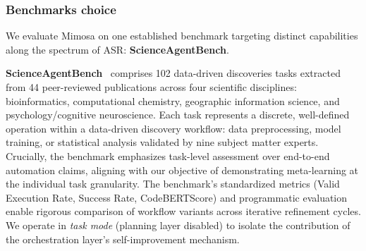 \documentclass{article}
\begin{document}
\subsubsection{Benchmarks choice}

We evaluate Mimosa on one established benchmark targeting distinct capabilities along the spectrum of ASR: \textbf{ScienceAgentBench}.

\textbf{ScienceAgentBench}~\cite{33_chen2025scienceagentbenchrigorousassessmentlanguage} comprises 102 data-driven discoveries tasks extracted from 44 peer-reviewed publications across four scientific disciplines: bioinformatics, computational chemistry, geographic information science, and psychology/cognitive neuroscience. Each task represents a discrete, well-defined operation within a data-driven discovery workflow: data preprocessing, model training, or statistical analysis validated by nine subject matter experts. Crucially, the benchmark emphasizes task-level assessment over end-to-end automation claims, aligning with our objective of demonstrating meta-learning at the individual task granularity. The benchmark's standardized metrics (Valid Execution Rate, Success Rate, CodeBERTScore) and programmatic evaluation enable rigorous comparison of workflow variants across iterative refinement cycles. We operate in \textit{task mode} (planning layer disabled) to isolate the contribution of the orchestration layer's self-improvement mechanism.

\end{document}
